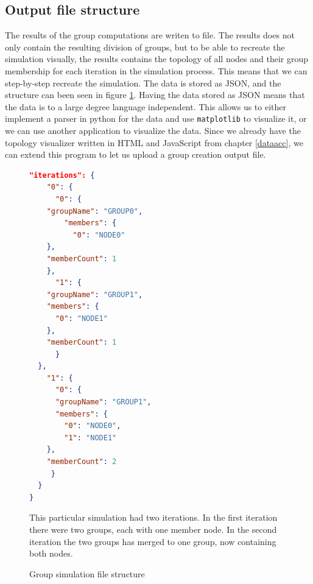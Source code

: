 \subsection{Output file structure}
The results of the group computations are writen to file. The results does not only contain the resulting division of groups, but to be able to recreate the simulation
visually, the results contains the topology of all nodes and their group membership for each iteration in the simulation process. This means that we can step-by-step
recreate the simulation. The data is stored as JSON, and the structure can been seen in figure \ref{fig:jsongroup}.
Having the data stored as JSON means that the data is to a large degree language independent.
This allows us to either implement a parser in python for the data and use \verb|matplotlib| to visualize it,
or we can use another application to visualize the data. Since we already have the topology visualizer
written in HTML and JavaScript from chapter \ref{dataacc}, we can extend this program to let us upload a group creation output file. 
\begin{figure}

\begin{minipage}{\linewidth}
\begin{lstlisting}[language=json]
  "iterations": {
    "0": {
      "0": {
	"groupName": "GROUP0",
        "members": {
          "0": "NODE0"
	},
	"memberCount": 1
    },
      "1": {
	"groupName": "GROUP1",
	"members": {
	  "0": "NODE1"
	},
	"memberCount": 1
      }
  },
    "1": {
      "0": {
	  "groupName": "GROUP1",
	  "members": {
	    "0": "NODE0",
	    "1": "NODE1"
	},
	"memberCount": 2
     }
  }
}
\end{lstlisting}
\end{minipage}

\caption{Group simulation file structure}
\medskip
\small
This particular simulation had two iterations. In the first iteration there were two groups, each with one member node. In the second iteration the two groups has merged to one group, now
containing both nodes. 
\label{fig:jsongroup}
\end{figure}




